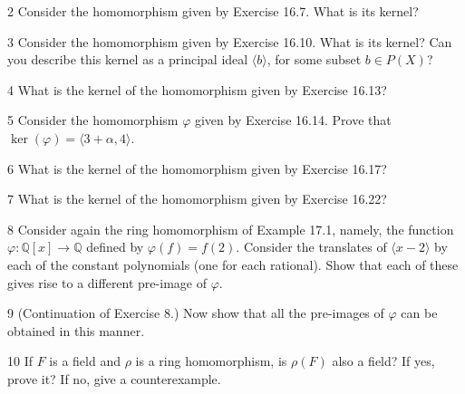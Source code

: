 \begin{problem}{2}
    Consider the homomorphism given by Exercise 16.7. What is its kernel?
\end{problem}
\unsolved

\begin{problem}{3}
    Consider the homomorphism given by Exercise 16.10. What is its kernel? Can you
    describe this kernel as a principal ideal $\langle b \rangle$, for some subset
    $b \in P(X)$?
\end{problem}
\unsolved

\begin{problem}{4}
    What is the kernel of the homomorphism given by Exercise 16.13?
\end{problem}
\unsolved

\begin{problem}{5}
    Consider the homomorphism $\varphi$ given by Exercise 16.14. Prove that
    $\ker(\varphi) = \langle 3 + \alpha, 4 \rangle$.
\end{problem}
\unsolved

\begin{problem}{6}
    What is the kernel of the homomorphism given by Exercise 16.17?
\end{problem}
\unsolved

\begin{problem}{7}
    What is the kernel of the homomorphism given by Exercise 16.22?
\end{problem}
\unsolved

\begin{problem}{8}
    Consider again the ring homomorphism of Example 17.1, namely, the function
    $\varphi : \mathbb{Q}[x] \to \mathbb{Q}$ defined by $\varphi(f) = f(2)$. Consider the
    translates of $\langle x - 2 \rangle$ by each of the constant polynomials (one for
    each rational). Show that each of these gives rise to a different pre-image of
    $\varphi$.
\end{problem}
\unsolved

\begin{problem}{9}
    (Continuation of Exercise 8.) Now show that all the pre-images of $\varphi$ can be
    obtained in this manner.
\end{problem}
\unsolved

\begin{problem}{10}
    If $F$ is a field and $\rho$ is a ring homomorphism, is $\rho(F)$
    also a field? If yes, prove it? If no, give a counterexample.
\end{problem}
\solved

